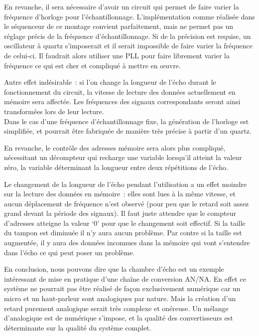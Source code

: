\documentclass{article}
\begin{document}
En revanche, il sera nécessaire d'avoir un circuit qui permet de faire varier la fréquence d'horloge pour l'échantillonnage. L'implémentation comme réalisée dans le séquenceur de ce montage convient parfaitement, mais ne permet pas un réglage précis de la fréquence d'échantillonnage. Si de la précision est requise, un oscillateur à quartz s'imposerait et il serait impossible de faire varier la fréquence de celui-ci. Il faudrait alors utiliser une PLL pour faire librement varier la fréquence ce qui est cher et compliqué à mettre en œuvre.

Autre effet indésirable~: si l'on change la longueur de l'écho durant le fonctionnement du circuit, la vitesse de lecture des données actuellement en mémoire sera affectée. Les fréquences des signaux correspondants seront ainsi transformées lors de leur lecture.
\\

Dans le cas d'une fréquence d'échantillonnage fixe, la génération de l'horloge est simplifiée, et pourrait être fabriquée de manière très précise à partir d'un quartz.

En revanche, le contrôle des adresses mémoire sera alors plus compliqué, nécessitant un décompteur qui recharge une variable lorsqu'il atteint la valeur zéro, la variable déterminant la longueur entre deux répétitions de l'écho.

Le changement de la longueur de l'écho pendant l'utilisation a un effet moindre sur la lecture des données en mémoire~: elles sont lues à la même vitesse, et aucun déplacement de fréquence n'est observé (pour peu que le retard soit assez grand devant la période des signaux). Il faut juste attendre que le compteur d'adresses atteigne la valeur `0' pour que le changement soit effectif. Si la taille du tampon est diminuée il n'y aura aucun problème. Par contre si la taille est augmentée, il y aura des données inconnues dans la mémoire qui vont s'entendre dans l'écho ce qui peut poser un problème.

En conclusion, nous pouvons dire que la chambre d'écho est un exemple intéressant de mise en pratique d'une chaîne de conversion AN/NA. En effet ce système ne pourrait pas être réalisé de façon exclusivement numérique car un micro et un haut-parleur sont analogiques par nature. Mais la création d'un retard purement analogique serait très complexe et onéreuse. Un mélange d'analogique est de numérique s'impose, et la qualité des convertisseurs est déterminante sur la qualité du système complet.
\end{document}
